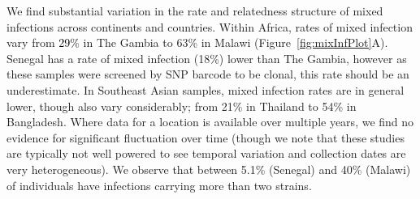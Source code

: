 \documentclass[9pt,lineno]{elife}
\begin{document}
\begin{table}[btp]
\end{table}



We find substantial variation in the rate and relatedness structure of mixed infections across continents and countries.  Within Africa, rates of mixed infection vary from \textcolor{black}{29}\% in The Gambia to 63\% in Malawi (Figure~\ref{fig:mixInfPlot}A). Senegal has a rate of mixed infection (18\%) lower than The Gambia, however as these samples were screened by SNP barcode to be clonal, this rate should be an underestimate.  In Southeast Asian samples, mixed infection rates are in general lower, though also vary considerably; from 21\% in Thailand to 54\% in Bangladesh.  Where data for a location is available over multiple years, we find no evidence for significant fluctuation over time (though we note that these studies are typically not well powered to see temporal variation and collection dates are very heterogeneous). We observe that between 5.1\% (Senegal) and 40\% (Malawi) of individuals have infections carrying more than two strains.
\end{document}

